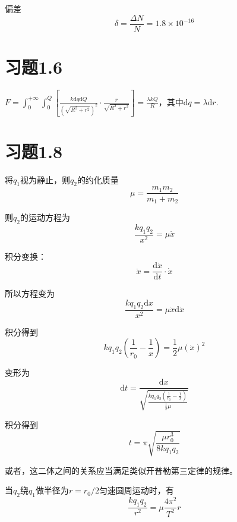\documentclass{SCIS2020cn}
\begin{document}
偏差
\begin{equation}
    \displaystyle\delta=\frac{\Delta{N}}{N}=1.8×10^{-16}
\end{equation}


\section{习题1.6}
$\displaystyle F=\int_0^{+\infty}\int_0^Q{\left[\frac{k\text{d}q\text{d}Q}{(\sqrt{R^2+r^2})^2}·\frac{r}{\sqrt{R^2+r^2}}\right]}=\frac{\lambda kQ}{R}$，其中$\text{d}q=\lambda\text{d}r$.

\section{习题1.8}
将$q_1$视为静止，则$q_2$的约化质量
\begin{equation}
    \mu=\frac{m_1m_2}{m_1+m_2}
\end{equation}

则$q_2$的运动方程为
\begin{equation}
    \frac{kq_1q_2}{x^2}=\mu{\ddot{x}}
\end{equation}

积分变换：
\begin{equation}
    \ddot{x}=\frac{\text{d}\dot{x}}{\text{d}t}·\dot{x}
\end{equation}

所以方程变为
\begin{equation}
    \frac{kq_1q_2\text{d}x}{x^2}=\mu\dot{x}\text{d}\dot{x}
\end{equation}

积分得到
\begin{equation}
    \displaystyle kq_1q_2\left(\frac{1}{r_0}-\frac{1}{x}\right)=\frac{1}{2}\mu(\dot{x})^2
\end{equation}

变形为
\begin{equation}
    \text{d}t=\frac{\text{d}x}{\sqrt{\frac{kq_1q_2\left(\frac{1}{r_0}-\frac{1}{x}\right)}{\frac{1}{2}\mu}}}
\end{equation}


积分得到
\begin{equation}
    t=\pi\sqrt{\frac{\mu{r_0^3}}{8kq_1q_2}}
\end{equation}

或者，这二体之间的关系应当满足类似开普勒第三定律的规律。

当$q_2$绕$q_1$做半径为$r=r_0/2$匀速圆周运动时，有
\begin{equation}
    \frac{kq_1q_2}{r^2}=\mu\frac{4\pi^2}{T^2}r
\end{equation}
\end{document}
